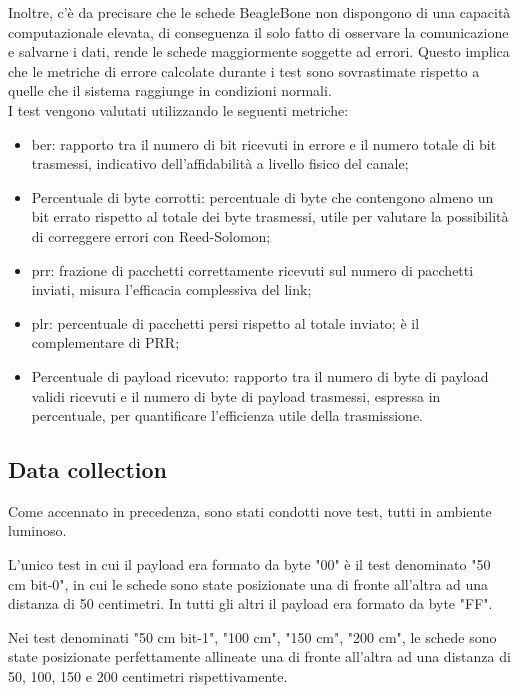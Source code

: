 Inoltre, c'è da precisare che le schede BeagleBone non dispongono di una capacità computazionale elevata, di conseguenza il solo fatto di osservare la comunicazione e salvarne i dati, rende le schede maggiormente soggette ad errori. Questo implica che le metriche di errore calcolate durante i test sono sovrastimate rispetto a quelle che il sistema raggiunge in condizioni normali.\\

\noindent I test vengono valutati utilizzando le seguenti metriche:
\begin{itemize}
    \item \gls{ber}\glsfirstoccur: rapporto tra il numero di bit ricevuti in errore e il numero totale di bit trasmessi, indicativo dell’affidabilità a livello fisico del canale;
    \item Percentuale di byte corrotti: percentuale di byte che contengono almeno un bit errato rispetto al totale dei byte trasmessi, utile per valutare la possibilità di correggere errori con Reed-Solomon;
    \item \gls{prr}\glsfirstoccur: frazione di pacchetti correttamente ricevuti sul numero di pacchetti inviati, misura l’efficacia complessiva del link;
    \item \gls{plr}\glsfirstoccur: percentuale di pacchetti persi rispetto al totale inviato; è il complementare di PRR;
    \item Percentuale di payload ricevuto: rapporto tra il numero di byte di payload validi ricevuti e il numero di byte di payload trasmessi, espressa in percentuale, per quantificare l’efficienza utile della trasmissione.
\end{itemize}

\subsection{Data collection}
Come accennato in precedenza, sono stati condotti nove test, tutti in ambiente luminoso.

L'unico test in cui il payload era formato da byte "00" è il test denominato "50 cm bit-0", in cui le schede sono state posizionate una di fronte all'altra ad una distanza di 50 centimetri. In tutti gli altri il payload era formato da byte "FF".

Nei test denominati "50 cm bit-1", "100 cm", "150 cm", "200 cm", le schede sono state posizionate perfettamente allineate una di fronte all'altra ad una distanza di 50, 100, 150 e 200 centimetri rispettivamente.

